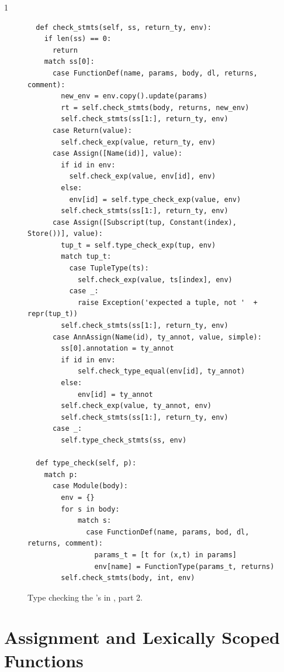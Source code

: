 \documentclass[7x10]{TimesAPriori_MIT}%
\def\pythonEd{1}
\providecommand{\BookEdition}{1}
\let\edition\BookEdition
\newcommand{\pythonColor}[0]{}
\numberwithin{theorem}{chapter}
\numberwithin{definition}{chapter}
\numberwithin{equation}{chapter}
\begin{document}
{\if\edition\pythonEd\pythonColor 
\begin{figure}[tbp]
  \begin{tcolorbox}[colback=white]
    \begin{lstlisting}
  def check_stmts(self, ss, return_ty, env):
    if len(ss) == 0:
      return
    match ss[0]:
      case FunctionDef(name, params, body, dl, returns, comment):
        new_env = env.copy().update(params)
        rt = self.check_stmts(body, returns, new_env)
        self.check_stmts(ss[1:], return_ty, env)
      case Return(value):
        self.check_exp(value, return_ty, env)
      case Assign([Name(id)], value):
        if id in env:
          self.check_exp(value, env[id], env)
        else:
          env[id] = self.type_check_exp(value, env)
        self.check_stmts(ss[1:], return_ty, env)
      case Assign([Subscript(tup, Constant(index), Store())], value):
        tup_t = self.type_check_exp(tup, env)
        match tup_t:
          case TupleType(ts):
            self.check_exp(value, ts[index], env)
          case _:
            raise Exception('expected a tuple, not '  + repr(tup_t))
        self.check_stmts(ss[1:], return_ty, env)
      case AnnAssign(Name(id), ty_annot, value, simple):
        ss[0].annotation = ty_annot
        if id in env:
            self.check_type_equal(env[id], ty_annot)
        else:
            env[id] = ty_annot
        self.check_exp(value, ty_annot, env)
        self.check_stmts(ss[1:], return_ty, env)
      case _:
        self.type_check_stmts(ss, env)

  def type_check(self, p):
    match p:
      case Module(body):
        env = {}
        for s in body:
            match s:
              case FunctionDef(name, params, bod, dl, returns, comment):
                params_t = [t for (x,t) in params]
                env[name] = FunctionType(params_t, returns)
        self.check_stmts(body, int, env)
\end{lstlisting}
  \end{tcolorbox}

  \caption{Type checking the 's in \LangLam{}, part 2.}
\label{fig:type-check-Llambda-part2}
\end{figure}
\fi}

\clearpage

\section{Assignment and Lexically Scoped Functions}
\label{sec:assignment-scoping}
\end{document}
